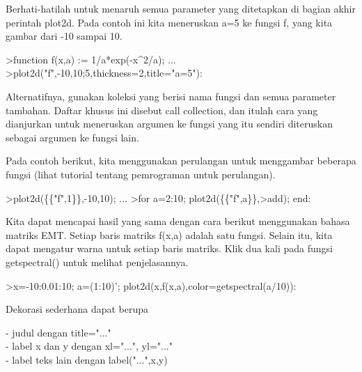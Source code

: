\documentclass[a4paper,10pt]{article}
\begin{document}
\begin{eulernotebook}
\begin{eulercomment}
\begin{eulercomment}
\begin{eulercomment}
\begin{eulercomment}
\begin{eulercomment}
\begin{eulercomment}
\begin{eulercomment}
Berhati-hatilah untuk menaruh semua parameter yang ditetapkan di bagian akhir perintah
plot2d. Pada contoh ini kita meneruskan a=5 ke fungsi f, yang kita gambar dari -10
sampai 10.
\end{eulercomment}
\begin{eulerprompt}
>function f(x,a) := 1/a*exp(-x^2/a); ...
>plot2d("f",-10,10;5,thickness=2,title="a=5"):
\end{eulerprompt}
\begin{eulercomment}
Alternatifnya, gunakan koleksi yang berisi nama fungsi dan semua parameter tambahan.
Daftar khusus ini disebut call collection, dan itulah cara yang dianjurkan untuk
meneruskan argumen ke fungsi yang itu sendiri diteruskan sebagai argumen ke fungsi
lain.

Pada contoh berikut, kita menggunakan perulangan untuk menggambar beberapa fungsi
(lihat tutorial tentang pemrograman untuk perulangan).
\end{eulercomment}
\begin{eulerprompt}
>plot2d(\{\{"f",1\}\},-10,10); ...
>for a=2:10; plot2d(\{\{"f",a\}\},>add); end:
\end{eulerprompt}
\begin{eulercomment}
Kita dapat mencapai hasil yang sama dengan cara berikut menggunakan bahasa matriks
EMT. Setiap baris matriks f(x,a) adalah satu fungsi. Selain itu, kita dapat mengatur
warna untuk setiap baris matriks. Klik dua kali pada fungsi getspectral() untuk
melihat penjelasannya.
\end{eulercomment}
\begin{eulerprompt}
>x=-10:0.01:10; a=(1:10)'; plot2d(x,f(x,a),color=getspectral(a/10)):
\end{eulerprompt}
\begin{eulercomment}
Dekorasi sederhana dapat berupa

- judul dengan title="..."\\
- label x dan y dengan xl="...", yl="..."\\
- label teks lain dengan label("...",x,y)


\end{eulercomment}
\end{eulercomment}
\end{eulercomment}
\end{eulercomment}
\end{eulercomment}
\end{eulercomment}
\end{eulercomment}
\end{eulernotebook}
\end{document}

